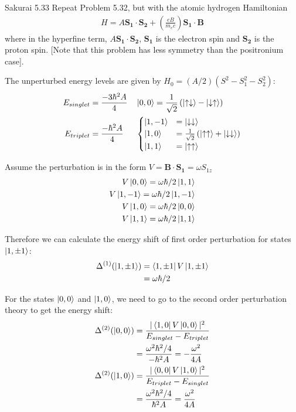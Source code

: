 \documentclass{article}
\newcommand{\bs}{\boldsymbol}
\begin{document}
\newpage
\begin{section}{Sakurai 5.33}
\newcommand{\up}{\uparrow}
\newcommand{\down}{\downarrow}
Repeat Problem 5.32, but with the atomic hydrogen Hamiltonian
\begin{align*}
	H = A \bs{S_1} \cdot \bs{S_2} + \left( \frac{eB}{m_e c} \right) \bs{S_1} \cdot \bs{B}
\end{align*}
where in the hyperfine term, $A \bs{S_1} \cdot \bs{S_2}$, $\bs{S_1}$ is the electron spin and $\bs{S_2}$ is the proton spin. [Note that this problem has less symmetry than the positronium case].

\begin{tcolorbox}[breakable]
	The unperturbed energy levels are given by $H_0 = (A/2) \left( S^2 - S_1^2 - S_2^2 \right)$:
	\begin{align*}
		E_{singlet} &= \frac{-3\hbar^2A}{4}	&& \ket{0, 0} = \frac{1}{\sqrt{2}} \left( \ket{\up \down} - \ket{\down \up} \right) \\
		E_{triplet} &= \frac{-\hbar^2A}{4}  &&\begin{cases}
			\ket{1, -1} &= \ket{\down \down} \\
			\ket{1, 0} &= \frac{1}{\sqrt{2}} \left( \ket{\up \up} + \ket{\down \down} \right) \\ 
			\ket{1, 1} &= \ket{\up \up}
		\end{cases}
	\end{align*}

	Assume the perturbation is in the form $V = \bs{B} \cdot \bs{S_1} = \omega S_{1z}$
	\begin{align*}
		V\ket{0, 0} = \omega \hbar/2 \ket{1, 1} \\
		V\ket{1, -1} = \omega \hbar/2 \ket{1, -1} \\
		V\ket{1, 0} = \omega \hbar/2 \ket{0, 0} \\
		V\ket{1, 1} = \omega \hbar/2 \ket{1, 1} 
	\end{align*}

	Therefore we can calculate the energy shift of first order perturbation for states $\ket{1, \pm 1}$:
	\begin{align*}
		\Delta^{(1)} (\ket{1, \pm 1})  &= \bra{1, \pm 1} V \ket{1, \pm 1} \\
		&= \omega \hbar/2
	\end{align*}

	For the states $\ket{0, 0}$ and $\ket{1, 0}$, we need to go to the second order perturbation theory to get the energy shift:
	\begin{align*}
		\Delta^{(2)} (\ket{0, 0}) &= \frac{|\bra{1,0}V\ket{0,0}|^2}{E_{singlet} - E_{triplet}} \\
		&= \frac{\omega^2 \hbar^2/4}{-\hbar^2A} = -\frac{\omega^2}{4A} \\
		\Delta^{(2)} (\ket{1, 0}) &= \frac{|\bra{0,0}V\ket{1,0}|^2}{E_{triplet} - E_{singlet}} \\
		&= \frac{\omega^2 \hbar^2/4}{\hbar^2A} = \frac{\omega^2}{4A}
	\end{align*}


\end{tcolorbox}
\end{section}
\end{document}
